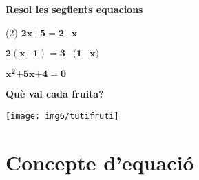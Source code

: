   \vso
  
\begin{iniaval}
	\textbf{Resol les següents equacions}
	
	\begin{tasks}(2)
		\task  $\boldsymbol{2}\boldsymbol{x}\boldsymbol{+}\boldsymbol{5}\boldsymbol{=}\boldsymbol{2}\boldsymbol{-}\boldsymbol{x}$
		
		
		\task
		$ \boldsymbol{2}\left(\boldsymbol{x}\boldsymbol{-}\boldsymbol{1}\right)\boldsymbol{=}\boldsymbol{3}\boldsymbol{-}\boldsymbol{(}\boldsymbol{1}\boldsymbol{-}\boldsymbol{x}\boldsymbol{)}$ 
		
		\vso
		\vso
	 	
		
		\task
		${\boldsymbol{x}}^{\boldsymbol{2}}\boldsymbol{+}\boldsymbol{5}\boldsymbol{x}\boldsymbol{+}\boldsymbol{4}\boldsymbol{=}\boldsymbol{0}$
		
		
		\task \textbf{Què val cada fruita?}
		
		\texttt{[image: img6/tutifruti]}
		
		
	\end{tasks}
	\vso
	
	
\end{iniaval}



\pagebreak

\section{ Concepte d'equació }

